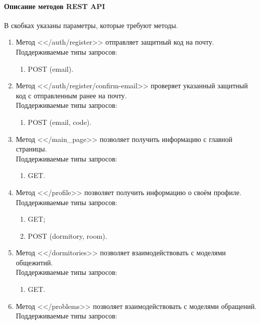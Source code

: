 \documentclass{../includes/TechDoc}
\begin{document}
    \paragraph{Описание методов REST API}
    В скобках указаны параметры, которые требуют методы.
    \begin{enumerate}
        \item Метод <</auth/register>> отправляет защитный код на почту.\\
        Поддерживаемые типы запросов:
        \begin{enumerate}
            \item POST (email)\@.
        \end{enumerate}
        \item Метод <</auth/register/confirm-email>> проверяет указанный защитный код с отправленным ранее на почту.\\
        Поддерживаемые типы запросов:
        \begin{enumerate}
            \item POST (email, code)\@.
        \end{enumerate}
        \item Метод <</main\_page>> позволяет получить информацию с главной страницы.\\
        Поддерживаемые типы запросов:
        \begin{enumerate}
            \item GET\@.
        \end{enumerate}
        \item Метод <</profile>> позволяет получить информацию о своём профиле.\\
        Поддерживаемые типы запросов:
        \begin{enumerate}
            \item GET\@;
            \item POST (dormitory, room)\@.
        \end{enumerate}
        \item Метод <</dormitories>> позволяет взаимодействовать с моделями общежитий.\\
        Поддерживаемые типы запросов:
        \begin{enumerate}
            \item GET\@.
        \end{enumerate}
        \item Метод <</problems>> позволяет взаимодействовать с моделями обращений.
        Поддерживаемые типы запросов:

\end{enumerate}
\end{document}

